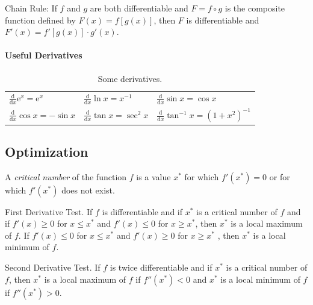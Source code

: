 \documentclass[captions=tableheading]{scrbook}
\begin{document}
\begin{thm}
Chain Rule: If \(f\) and \(g\) are both differentiable and \(F=f\circ g\) is the composite function defined by \(F(x)=f[g(x)]\), then \(F\) is differentiable and \(F'(x) = f'[ g(x) ] \cdot g'(x)\).  
\end{thm}

\paragraph*{Useful Derivatives}


\begin{table}[htb]
\caption[Some derivatives]{Some derivatives.} \label{tab:Useful-Derivatives}
\begin{center}
\begin{tabular}{lll}
 \(\frac{\mathrm{d}}{\mathrm{d} x}\mathrm{e}^{x}=\mathrm{e}^{x}\)  &  \(\frac{\mathrm{d}}{\mathrm{d} x}\ln x=x^{-1}\)      &  \(\frac{\mathrm{d}}{\mathrm{d} x}\sin x=\cos x\)              \\
 \(\frac{\mathrm{d}}{\mathrm{d} x}\cos x=-\sin x\)                 &  \(\frac{\mathrm{d}}{\mathrm{d} x}\tan x=\sec^{2}x\)  &  \(\frac{\mathrm{d}}{\mathrm{d} x}\tan^{-1}x=(1+x^{2})^{-1}\)  \\
\end{tabular}
\end{center}
\end{table}
\subsection{Optimization}
\label{sec-21-2-3}

\begin{defn}
A \emph{critical number} of the function \(f\) is a value \(x^{\ast}\) for which \(f'(x^{\ast})=0\) or for which \(f'(x^{\ast})\) does not exist.
\end{defn}

\begin{thm}
\label{thm:First-Derivative-Test}
First Derivative Test. If \(f\) is differentiable and if \(x^{\ast}\) is a critical number of \(f\) and if \(f'(x)\geq0\) for \(x\leq x^{\ast}\) and \(f'(x)\leq0\) for \(x\geq x^{\ast}\), then \(x^{\ast}\) is a local maximum of \(f\). If \(f'(x)\leq0\) for \(x\leq x^{\ast}\) and \(f'(x)\geq0\) for \(x\geq x^{\ast}\) , then \(x^{\ast}\) is a local minimum of \(f\).
\end{thm}

\begin{thm}
Second Derivative Test. If \(f\) is twice differentiable and if \(x^{\ast}\) is a critical number of \(f\), then \(x^{\ast}\) is a local maximum of \(f\) if \(f''(x^{\ast})<0\) and \(x^{\ast}\) is a local minimum of \(f\) if \(f''(x^{\ast})>0\).
\end{thm}
\end{document}
